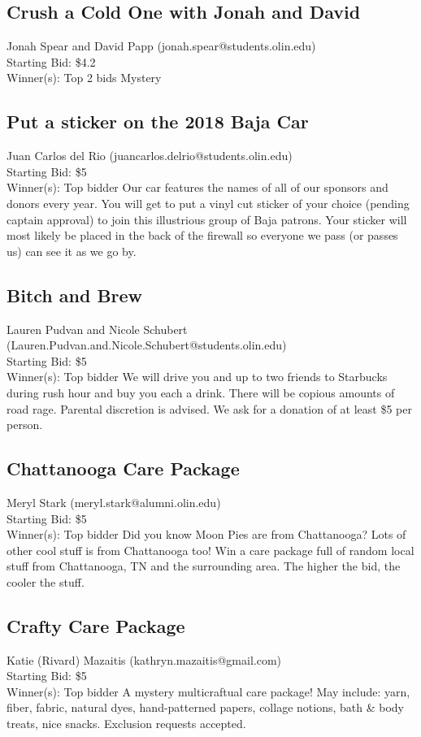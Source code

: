 \documentclass[11pt]{article}
\begin{document}
\subsection{Crush a Cold One with Jonah and David}
Jonah Spear and David Papp (jonah.spear@students.olin.edu) \\
Starting Bid: \$4.2 \\
Winner(s): 
Top 2 bids\newline
Mystery
\subsection{Put a sticker on the 2018 Baja Car}
Juan Carlos del Rio (juancarlos.delrio@students.olin.edu) \\
Starting Bid: \$5 \\
Winner(s): 
Top bidder\newline
Our car features the names of all of our sponsors and donors every year. You will get to put a vinyl cut sticker of your choice (pending captain approval) to join this illustrious group of Baja patrons. Your sticker will most likely be placed in the back of the firewall so everyone we pass (or passes us) can see it as we go by.
\subsection{Bitch and Brew}
Lauren Pudvan and Nicole Schubert (Lauren.Pudvan.and.Nicole.Schubert@students.olin.edu) \\
Starting Bid: \$5 \\
Winner(s): 
Top bidder\newline
We will drive you and up to two friends to Starbucks during rush hour and buy you each a drink. There will be copious amounts of road rage. Parental discretion is advised.
We ask for a donation of at least \$5 per person.
\subsection{Chattanooga Care Package}
Meryl Stark (meryl.stark@alumni.olin.edu) \\
Starting Bid: \$5 \\
Winner(s): 
Top bidder\newline
Did you know Moon Pies are from Chattanooga? Lots of other cool stuff is from Chattanooga too! Win a care package full of random local stuff from Chattanooga, TN and the surrounding area. The higher the bid, the cooler the stuff.
\subsection{Crafty Care Package}
Katie (Rivard) Mazaitis (kathryn.mazaitis@gmail.com) \\
Starting Bid: \$5 \\
Winner(s): 
Top bidder\newline
A mystery multicraftual care package! May include: yarn, fiber, fabric, natural dyes, hand-patterned papers, collage notions, bath \& body treats, nice snacks. Exclusion requests accepted.
\end{document}
